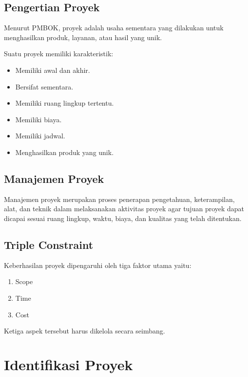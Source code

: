 \documentclass[12pt,a4paper]{article}
\begin{document}
\subsection{Pengertian Proyek}

Menurut PMBOK, proyek adalah usaha sementara yang dilakukan untuk menghasilkan produk, layanan, atau hasil yang unik.

Suatu proyek memiliki karakteristik:

\begin{itemize}
\item Memiliki awal dan akhir.
\item Bersifat sementara.
\item Memiliki ruang lingkup tertentu.
\item Memiliki biaya.
\item Memiliki jadwal.
\item Menghasilkan produk yang unik.
\end{itemize}


\subsection{Manajemen Proyek}

Manajemen proyek merupakan proses penerapan pengetahuan, keterampilan, alat, dan teknik dalam melaksanakan aktivitas proyek agar tujuan proyek dapat dicapai sesuai ruang lingkup, waktu, biaya, dan kualitas yang telah ditentukan.


\subsection{Triple Constraint}

Keberhasilan proyek dipengaruhi oleh tiga faktor utama yaitu:

\begin{enumerate}
\item Scope
\item Time
\item Cost
\end{enumerate}

Ketiga aspek tersebut harus dikelola secara seimbang.


\section{Identifikasi Proyek}
\end{document}

